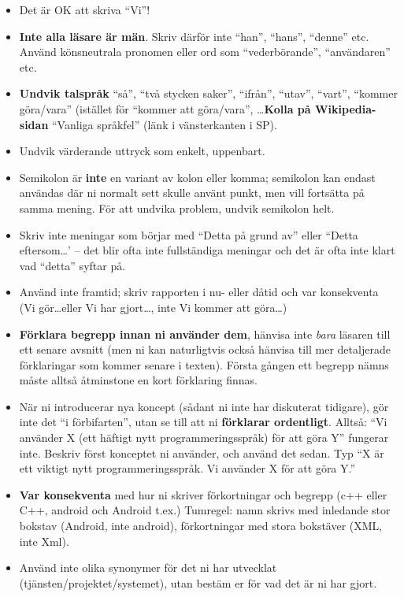 \documentclass[a4paper,12pt]{article}
\begin{document}
\begin{itemize}
\item    Det är OK att skriva ``Vi''!

\item    \textbf{Inte alla läsare är män}.  Skriv därför inte ``han'', ``hans'', ``denne'' etc.  Använd könsneutrala pronomen eller ord som ``vederbörande'', ``användaren'' etc.

\item    \textbf{Undvik talspråk} ``så'', ``två stycken saker'', ``ifrån'', ``utav'', ``vart'', ``kommer göra/vara'' (istället för ``kommer att göra/vara'', \ldots \textbf{Kolla på Wikipedia-sidan} ``Vanliga språkfel'' (länk i vänsterkanten i SP).

\item    Undvik värderande uttryck som enkelt, uppenbart.

\item    Semikolon är \textbf{inte} en variant av kolon eller komma; semikolon kan endast användas där ni normalt sett skulle använt punkt, men vill fortsätta på samma mening. För att undvika problem, undvik semikolon helt.

\item    Skriv inte meningar som börjar med ``Detta på grund av'' eller ``Detta eftersom\ldots' -- det blir ofta inte fullständiga meningar och det är ofta inte klart vad ``detta'' syftar på.

\item    Använd inte framtid; skriv rapporten i nu- eller dåtid och var konsekventa (Vi gör\ldots eller Vi har gjort\ldots, inte Vi kommer att göra\ldots)

\item    \textbf{Förklara begrepp innan ni använder dem}, hänvisa inte \emph{bara} läsaren till ett senare avsnitt (men ni kan naturligtvis också hänvisa till mer detaljerade förklaringar som kommer senare i texten).  Första gången ett begrepp nämns måste alltså åtminstone en kort förklaring finnas.

\item    När ni introducerar nya koncept (sådant ni inte har diskuterat tidigare), gör inte det ``i förbifarten'', utan se till att ni \textbf{förklarar ordentligt}.  Alltså: ``Vi använder X (ett häftigt nytt programmeringsspråk) för att göra Y'' fungerar inte.  Beskriv först konceptet ni använder, och använd det sedan.  Typ ``X är ett viktigt nytt programmeringsspråk.  Vi använder X för att göra Y.''

\item    \textbf{Var konsekventa} med hur ni skriver förkortningar och begrepp (c++ eller C++, android och Android t.ex.) Tumregel: namn skrivs med inledande stor bokstav (Android, inte android), förkortningar med stora bokstäver (XML, inte Xml).
\item    Använd inte olika synonymer för det ni har utvecklat (tjänsten/projektet/systemet), utan bestäm er för vad det är ni har gjort.


\end{itemize}
\end{document}
